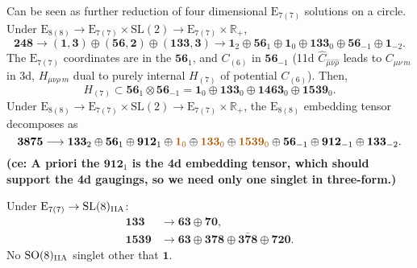 \documentclass[11pt]{article}
\newcommand{\SO}{\ensuremath{\mathrm{SO}}\xspace}
\newcommand{\SL}{\ensuremath{\mathrm{SL}}\xspace}
\newcommand{\E}{\ensuremath{\mathrm{E}}\xspace}
\newcommand{\R}{\ensuremath{\mathbb{R}}\xspace}
\newcommand{\ce}[1]{\marginpar{\parbox{\marginparwidth}{\boldmath $\Longleftarrow$}}
{\boldmath\bfseries (ce: #1)}}
\begin{document}
Can be seen as further reduction of four dimensional $\E_{7(7)}$ solutions on a circle. Under $\E_{8(8)}\rightarrow\E_{7(7)}\times\SL(2)\rightarrow\E_{7(7)}\times\R_{+}$,
\begin{equation}
  \bm{248} \longrightarrow (\bm{1},\bm{3}) \oplus (\bm{56},\bm{2}) \oplus (\bm{133},\bm{3})\longrightarrow \bm{1}_{2} \oplus \bm{56}_{1} \oplus \bm{1}_{0} \oplus \bm{133}_{0} \oplus \bm{56}_{-1} \oplus \bm{1}_{-2}.
\end{equation}
The $\E_{7(7)}$ coordinates are in the $\bm{56}_{1}$, and $C_{(6)}$ in $\bm{56}_{-1}$ (11d $\hat{C}_{\hat\mu\hat\nu\hat\rho}$ leads to $C_{\mu\nu\,m}$ in 3d, $H_{\mu\nu\rho\,m}$ dual to purely internal $H_{(7)}$ of potential $C_{(6)}$). Then,
\begin{equation}
    H_{(7)} \subset \bm{56}_{1} \otimes \bm{56}_{-1} = \bm{1}_{0} \oplus \bm{133}_{0} \oplus \bm{1463}_{0} \oplus \bm{1539}_{0}.
\end{equation}
Under $\E_{8(8)}\rightarrow\E_{7(7)}\times\SL(2)\rightarrow\E_{7(7)}\times\R_{+}$, the $\E_{8(8)}$ embedding tensor decomposes as
\begin{equation}
    \bm{3875} \longrightarrow \bm{133}_{2} \oplus \bm{56}_{1} \oplus \bm{912}_{1} \oplus {\color{mydarkorange}\bm{1}_{0}} \oplus {\color{mydarkorange}\bm{133}_{0}} \oplus {\color{mydarkorange}\bm{1539}_{0}} \oplus \bm{56}_{-1} \oplus \bm{912}_{-1} \oplus \bm{133}_{-2}.
\end{equation}
\ce{A priori the $\bm{912}_{1}$ is the 4d embedding tensor, which should support the 4d gaugings, so we need only one singlet in three-form.}

Under $\E_{7(7)}\rightarrow\SL(8)_{\rm IIA}$:
\begin{equation}
  \begin{aligned}
    \bm{133} & \longrightarrow \bm{63} \oplus \bm{70},\\
    \bm{1539} & \longrightarrow \bm{63} \oplus \bm{378} \oplus \bm{\bar{378}} \oplus \bm{720}.
  \end{aligned}
\end{equation}
No $\SO(8)_{\rm IIA}$ singlet other that $\bm{1}$.

\end{document}
